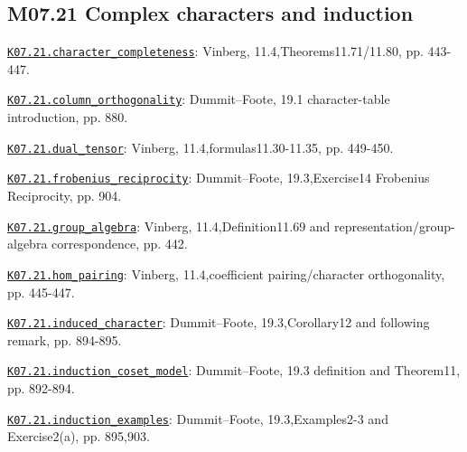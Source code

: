 \subsection*{M07.21 Complex characters and induction}
\par\smallskip\noindent\hypertarget{src:K07.21.character_completeness}{}\label{src:K07.21.character_completeness}\hyperref[K07.21.character_completeness]{\texttt{K07.21.character\_completeness}}: Vinberg, 11.4,Theorems11.71/11.80, pp. 443-447.
\par\smallskip\noindent\hypertarget{src:K07.21.column_orthogonality}{}\label{src:K07.21.column_orthogonality}\hyperref[K07.21.column_orthogonality]{\texttt{K07.21.column\_orthogonality}}: Dummit--Foote, 19.1 character-table introduction, pp. 880.
\par\smallskip\noindent\hypertarget{src:K07.21.dual_tensor}{}\label{src:K07.21.dual_tensor}\hyperref[K07.21.dual_tensor]{\texttt{K07.21.dual\_tensor}}: Vinberg, 11.4,formulas11.30-11.35, pp. 449-450.
\par\smallskip\noindent\hypertarget{src:K07.21.frobenius_reciprocity}{}\label{src:K07.21.frobenius_reciprocity}\hyperref[K07.21.frobenius_reciprocity]{\texttt{K07.21.frobenius\_reciprocity}}: Dummit--Foote, 19.3,Exercise14 Frobenius Reciprocity, pp. 904.
\par\smallskip\noindent\hypertarget{src:K07.21.group_algebra}{}\label{src:K07.21.group_algebra}\hyperref[K07.21.group_algebra]{\texttt{K07.21.group\_algebra}}: Vinberg, 11.4,Definition11.69 and representation/group-algebra correspondence, pp. 442.
\par\smallskip\noindent\hypertarget{src:K07.21.hom_pairing}{}\label{src:K07.21.hom_pairing}\hyperref[K07.21.hom_pairing]{\texttt{K07.21.hom\_pairing}}: Vinberg, 11.4,coefficient pairing/character orthogonality, pp. 445-447.
\par\smallskip\noindent\hypertarget{src:K07.21.induced_character}{}\label{src:K07.21.induced_character}\hyperref[K07.21.induced_character]{\texttt{K07.21.induced\_character}}: Dummit--Foote, 19.3,Corollary12 and following remark, pp. 894-895.
\par\smallskip\noindent\hypertarget{src:K07.21.induction_coset_model}{}\label{src:K07.21.induction_coset_model}\hyperref[K07.21.induction_coset_model]{\texttt{K07.21.induction\_coset\_model}}: Dummit--Foote, 19.3 definition and Theorem11, pp. 892-894.
\par\smallskip\noindent\hypertarget{src:K07.21.induction_examples}{}\label{src:K07.21.induction_examples}\hyperref[K07.21.induction_examples]{\texttt{K07.21.induction\_examples}}: Dummit--Foote, 19.3,Examples2-3 and Exercise2(a), pp. 895,903.
